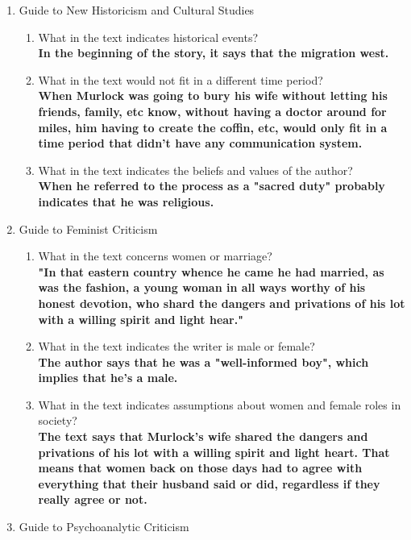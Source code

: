 \begin{enumerate}
  \label{enum:questions}

  \item Guide to New Historicism and Cultural Studies \\
    \begin{enumerate}
      \label{enum:questions_1}
    
      \item What in the text indicates historical events? \\
          \textbf{In the beginning of the story, it says that the migration west.} \\
      \item What in the text would not fit in a different time period? \\
        \textbf{When Murlock was going to bury his wife without letting his friends,
          family, etc know, without having a doctor around for miles, him having to
          create the coffin, etc, would only fit in a time period that didn't have
          any communication system.}
      \item What in the text indicates the beliefs and values of the author? \\
        \textbf{When he referred to the process as a "sacred duty" probably
        indicates that he was religious.}
    \end{enumerate}
  \item Guide to Feminist Criticism \\
    \begin{enumerate}
      \label{enum:questions_2}
    
      \item What in the text concerns women or marriage? \\
          \textbf{"In that eastern country whence he came he had married, as was
          the fashion, a young woman in all ways worthy of his honest devotion,
          who shard the dangers and privations of his lot with a willing spirit and
          light hear."}
      \item What in the text indicates the writer is male or female? \\
          \textbf{The author says that he was a "well-informed boy", which implies
            that he's a male.}
      \item What in the text indicates assumptions about women and female roles
        in society? \\
          \textbf{The text says that Murlock's wife shared the dangers and
            privations of his lot with a willing spirit and light heart. That
            means that women back on those days had to agree with everything that
            their husband said or did, regardless if they really agree or not.}
    \end{enumerate}
  \item Guide to Psychoanalytic Criticism \\
    \begin{enumerate}
      \label{enum:questions_3}
    

\end{enumerate}
\end{enumerate}
